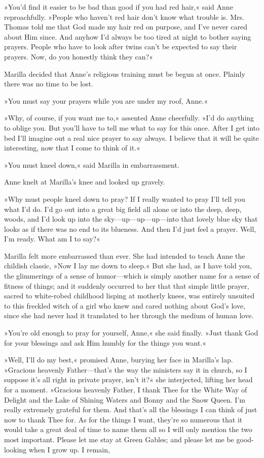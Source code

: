 »You’d find it easier to be bad than good if you had red hair,« said Anne reproachfully. »People who haven’t red hair don’t know what trouble is. Mrs. Thomas told me that God made my hair red on purpose, and I’ve never cared about Him since. And anyhow I’d always be too tired at night to bother saying prayers. People who have to look after twins can’t be expected to say their prayers. Now, do you honestly think they can?«

Marilla decided that Anne’s religious training must be begun at once. Plainly there was no time to be lost.

»You must say your prayers while you are under my roof, Anne.«

»Why, of course, if you want me to,« assented Anne cheerfully. »I’d do anything to oblige you. But you’ll have to tell me what to say for this once. After I get into bed I’ll imagine out a real nice prayer to say always. I believe that it will be quite interesting, now that I come to think of it.«

»You must kneel down,« said Marilla in embarrassment.

Anne knelt at Marilla’s knee and looked up gravely.

»Why must people kneel down to pray? If I really wanted to pray I’ll tell you what I’d do. I’d go out into a great big field all alone or into the deep, deep, woods, and I’d look up into the sky—up—up—up—into that lovely blue sky that looks as if there was no end to its blueness. And then I’d just feel a prayer. Well, I’m ready. What am I to say?«

Marilla felt more embarrassed than ever. She had intended to teach Anne the childish classic, »Now I lay me down to sleep.« But she had, as I have told you, the glimmerings of a sense of humor—which is simply another name for a sense of fitness of things; and it suddenly occurred to her that that simple little prayer, sacred to white-robed childhood lisping at motherly knees, was entirely unsuited to this freckled witch of a girl who knew and cared nothing about God’s love, since she had never had it translated to her through the medium of human love.

»You’re old enough to pray for yourself, Anne,« she said finally. »Just thank God for your blessings and ask Him humbly for the things you want.«

»Well, I’ll do my best,« promised Anne, burying her face in Marilla’s lap. »Gracious heavenly Father—that’s the way the ministers say it in church, so I suppose it’s all right in private prayer, isn’t it?« she interjected, lifting her head for a moment. »Gracious heavenly Father, I thank Thee for the White Way of Delight and the Lake of Shining Waters and Bonny and the Snow Queen. I’m really extremely grateful for them. And that’s all the blessings I can think of just now to thank Thee for. As for the things I want, they’re so numerous that it would take a great deal of time to name them all so I will only mention the two most important. Please let me stay at Green Gables; and please let me be good-looking when I grow up. I remain,

